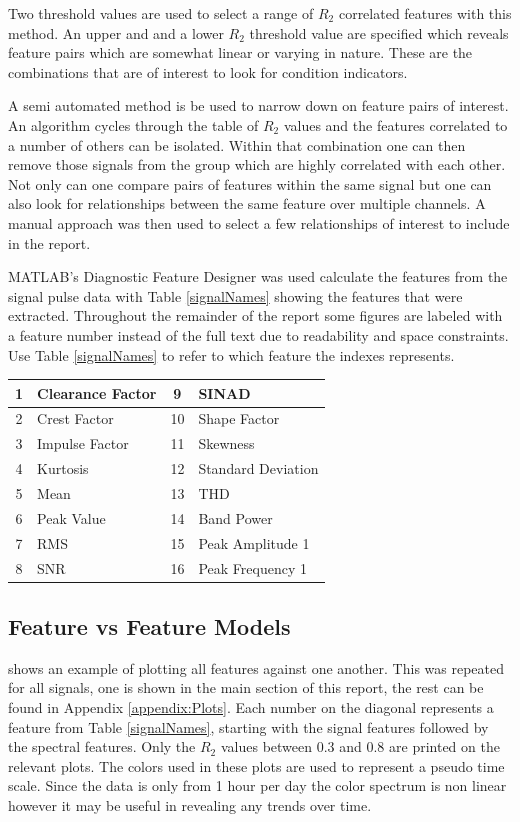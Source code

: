 \documentclass[]{article}
\begin{document}
Two threshold values are used to select a range of $R_2$ correlated features with this method. An upper and and a lower $R_2$ threshold value are specified which reveals feature pairs which are somewhat linear or varying in nature. These are the combinations that are of interest to look for condition indicators.

A semi automated method is be used to narrow down on feature pairs of interest. An algorithm cycles through the table of $R_2$ values and the features correlated to a number of others can be isolated. Within that combination one can then remove those signals from the group which are highly correlated with each other. Not only can one compare pairs of features within the same signal but one can also look for relationships between the same feature over multiple channels. A manual approach was then used to select a few relationships of interest to include in the report.

MATLAB's Diagnostic Feature Designer was used calculate the features from the signal pulse data with Table \ref{signalNames} showing the features that were extracted. Throughout the remainder of the report some figures are labeled with a feature number instead of the full text due to readability and space constraints. Use Table \ref{signalNames} to refer to which feature the indexes represents.

\begin{center}
\label{featureNames}
\begin{tabular}{ |c|l|c|l| }
 \hline
 1 & Clearance Factor & 9 & \gls{SINAD}\\
 \hline
 2 & Crest Factor & 10 & Shape Factor\\
 \hline
 3 & Impulse Factor & 11 & Skewness\\
 \hline
 4 & Kurtosis & 12 & Standard Deviation\\
 \hline
 5 & Mean & 13 & \gls{THD}\\
 \hline
 6 & Peak Value &  14 & Band Power \\
 \hline
 7 & \gls{RMS} & 15 & Peak Amplitude 1\\ 
 \hline              
 8 & \gls{SNR} & 16 & Peak Frequency 1 \\
 \hline        
\end{tabular}
\end{center}

\subsection{Feature vs Feature Models}
 shows an example of plotting all features against one another. This was repeated for all signals, one is shown in the main section of this report, the rest can be found in Appendix \ref{appendix:Plots}. Each number on the diagonal represents a feature from Table \ref{signalNames}, starting with the signal features followed by the spectral features. Only the $R_2$ values between 0.3 and 0.8 are printed on the relevant plots. The colors used in these plots are used to represent a pseudo time scale. Since the data is only from 1 hour per day the color spectrum is non linear however it may be useful in revealing any trends over time.
\end{document}
